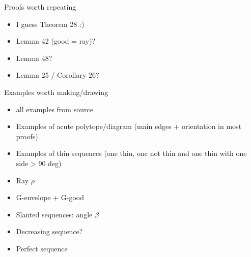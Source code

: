 


Proofs worth repeating
\begin{itemize}
  \item I guess Theorem 28 :)
  \item Lemma 42 (good = ray)?
  \item Lemma 48?
  \item Lemma 25 / Corollary 26?
\end{itemize}

Examples worth making/drawing
\begin{itemize}
  \item all examples from source
  \item Examples of acute polytope/diagram (main edges + orientation in most proofs)
  \item Examples of thin sequences (one thin, one not thin and one thin with one side > 90 deg)
  \item Ray $\rho$
  \item G-envelope + G-good
  \item Slanted sequences: angle $\beta$
  \item Decreasing sequence?
  \item Perfect sequence
\end{itemize}

